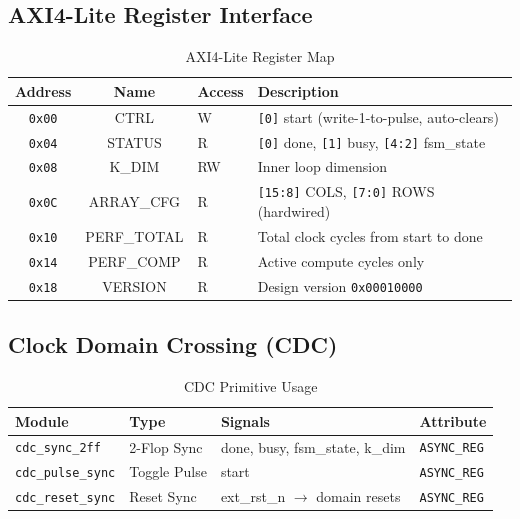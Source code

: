 \documentclass[12pt, a4paper]{article}
\begin{document}
\subsection{AXI4-Lite Register Interface}

\begin{table}[H]
\centering
\caption{AXI4-Lite Register Map}
\begin{tabular}{@{}ccll@{}}
\toprule
\textbf{Address} & \textbf{Name} & \textbf{Access} & \textbf{Description} \\
\midrule
\texttt{0x00} & CTRL        & W  & \texttt{[0]} start (write-1-to-pulse, auto-clears) \\
\texttt{0x04} & STATUS      & R  & \texttt{[0]} done, \texttt{[1]} busy, \texttt{[4:2]} fsm\_state \\
\texttt{0x08} & K\_DIM      & RW & Inner loop dimension \\
\texttt{0x0C} & ARRAY\_CFG  & R  & \texttt{[15:8]} COLS, \texttt{[7:0]} ROWS (hardwired) \\
\texttt{0x10} & PERF\_TOTAL & R  & Total clock cycles from start to done \\
\texttt{0x14} & PERF\_COMP  & R  & Active compute cycles only \\
\texttt{0x18} & VERSION     & R  & Design version \texttt{0x00010000} \\
\bottomrule
\end{tabular}
\end{table}

\subsection{Clock Domain Crossing (CDC)}

\begin{table}[H]
\centering
\caption{CDC Primitive Usage}
\begin{tabular}{@{}llll@{}}
\toprule
\textbf{Module} & \textbf{Type} & \textbf{Signals} & \textbf{Attribute} \\
\midrule
\texttt{cdc\_sync\_2ff}   & 2-Flop Sync    & done, busy, fsm\_state, k\_dim & \texttt{ASYNC\_REG} \\
\texttt{cdc\_pulse\_sync} & Toggle Pulse   & start                          & \texttt{ASYNC\_REG} \\
\texttt{cdc\_reset\_sync} & Reset Sync     & ext\_rst\_n $\to$ domain resets & \texttt{ASYNC\_REG} \\
\bottomrule
\end{tabular}
\end{table}
\end{document}
